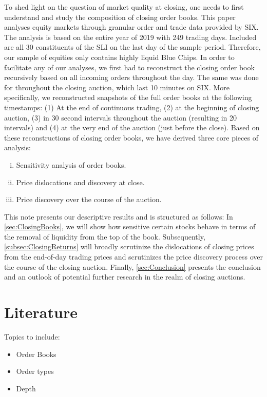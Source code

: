 \documentclass[11pt,a4paper]{article}
\begin{document}
    To shed light on the question of market quality at closing, one needs to first understand and study the composition of closing order books. This paper analyses equity markets through granular order and trade data provided by \acf{SIX}. The analysis is based on the entire year of 2019 with 249 trading days. Included are all 30 constituents of the \ac{SLI} on the last day of the sample period. Therefore, our sample of equities only contains highly liquid Blue Chips. In order to facilitate any of our analyses, we first had to reconstruct the closing order book recursively based on all incoming orders throughout the day. The same was done for throughout the closing auction, which last 10 minutes on \acf{SIX}. More specifically, we reconstructed snapshots of the full order books at the following timestamps: (1) At the end of continuous trading, (2) at the beginning of closing auction, (3) in 30 second intervals throughout the auction (resulting in 20 intervals) and (4) at the very end of the auction (just before the close). Based on these reconstructions of closing order books, we have derived three core pieces of analysis:
    \begin{enumerate}[(i)]
        \item Sensitivity analysis of order books.
        \item Price dislocations and discovery at close.
        \item Price discovery over the course of the auction.
    \end{enumerate}

    This note presents our descriptive results and is structured as follows: In \cref{sec:ClosingBooks}, we will show how sensitive certain stocks behave in terms of the removal of liquidity from the top of the book. Subsequently, \cref{subsec:ClosingReturns} will broadly scrutinize the dislocations of closing prices from the end-of-day trading prices and scrutinizes the price discovery process over the course of the closing auction. Finally, \cref{sec:Conclusion} presents the conclusion and an outlook of potential further research in the realm of closing auctions.


    \section{Literature} \label{sec:Literature}

    Topics to include:
    \begin{itemize}
        \item Order Books
        \item Order types
        \item Depth
    \end{itemize}
\end{document}
